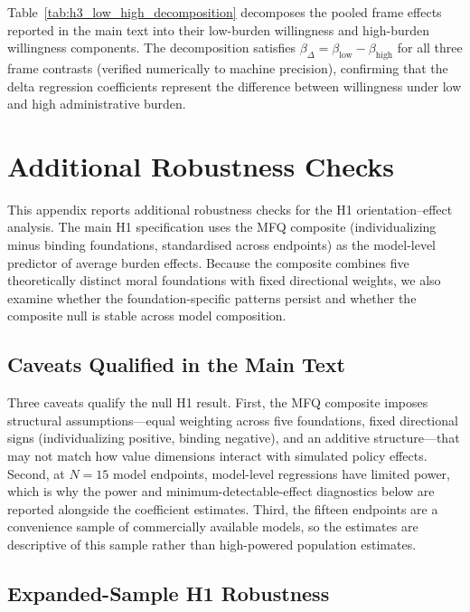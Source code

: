 \documentclass[11pt]{article}
\begin{document}
Table~\ref{tab:h3_low_high_decomposition} decomposes the pooled frame effects reported in the main text into their low-burden willingness and high-burden willingness components. The decomposition satisfies $\beta_{\Delta} = \beta_{\text{low}} - \beta_{\text{high}}$ for all three frame contrasts (verified numerically to machine precision), confirming that the delta regression coefficients represent the difference between willingness under low and high administrative burden.



\clearpage   %
\section{Additional Robustness Checks}
\label{app:additional-robustness}

This appendix reports additional robustness checks for the H1 orientation--effect analysis. The main H1 specification uses the MFQ composite (individualizing minus binding foundations, standardised across endpoints) as the model-level predictor of average burden effects. Because the composite combines five theoretically distinct moral foundations with fixed directional weights, we also examine whether the foundation-specific patterns persist and whether the composite null is stable across model composition.

\subsection{Caveats Qualified in the Main Text}

Three caveats qualify the null H1 result. First, the MFQ composite imposes structural assumptions---equal weighting across five foundations, fixed directional signs (individualizing positive, binding negative), and an additive structure---that may not match how value dimensions interact with simulated policy effects. Second, at $N = 15$ model endpoints, model-level regressions have limited power, which is why the power and minimum-detectable-effect diagnostics below are reported alongside the coefficient estimates. Third, the fifteen endpoints are a convenience sample of commercially available models, so the estimates are descriptive of this sample rather than high-powered population estimates.

\subsection{Expanded-Sample H1 Robustness}
\end{document}
